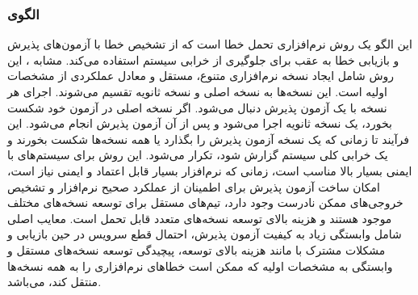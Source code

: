\subsubsection{الگوی }
\label{ArmoushSWRecoverBlockSec}
\begin{RTL}
این الگو یک روش نرم‌افزاری تحمل خطا است که از تشخیص خطا
با آزمون‌های پذیرش و بازیابی خطا به عقب برای جلوگیری از خرابی سیستم
استفاده می‌کند. مشابه ، این روش شامل ایجاد
 نسخه نرم‌افزاری متنوع، مستقل و معادل عملکردی
از مشخصات اولیه است. این نسخه‌ها به نسخه اصلی و 
نسخه ثانویه تقسیم می‌شوند. اجرای هر نسخه با یک
آزمون پذیرش دنبال می‌شود. اگر نسخه اصلی در آزمون خود شکست بخورد،
یک نسخه ثانویه  اجرا می‌شود
و پس از آن آزمون پذیرش انجام می‌شود. این فرآیند تا زمانی که
یک نسخه آزمون پذیرش را بگذارد یا همه نسخه‌ها شکست بخورند
و یک خرابی کلی سیستم گزارش شود، تکرار می‌شود.
این روش برای سیستم‌های با ایمنی بسیار بالا
مناسب است، زمانی که نرم‌افزار بسیار قابل اعتماد
و ایمنی نیاز است، امکان ساخت آزمون پذیرش برای اطمینان از
عملکرد صحیح نرم‌افزار و تشخیص خروجی‌های ممکن نادرست
وجود دارد، تیم‌های مستقل برای توسعه نسخه‌های مختلف موجود
هستند و هزینه بالای توسعه نسخه‌های متعدد قابل
تحمل است. معایب اصلی شامل وابستگی
زیاد به کیفیت آزمون پذیرش، احتمال قطع سرویس در
حین بازیابی و مشکلات مشترک با  مانند
هزینه بالای توسعه، پیچیدگی توسعه نسخه‌های مستقل و وابستگی به مشخصات
اولیه که ممکن است خطاهای نرم‌افزاری را به همه نسخه‌ها منتقل کند، می‌باشد.
\end{RTL}